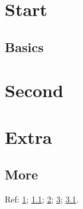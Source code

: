\documentclass{book}
\begin{document}
\tableofcontents
\chapter{Start}\label{start}
\section{Basics}\label{basics}
\chapter{Second}\label{second}
\appendix
\chapter{Extra}\label{extra}
\section{More}\label{more}
Ref: \ref{start}; \ref{basics}; \ref{second}; \ref{extra}; \ref{more}.
\end{document}
